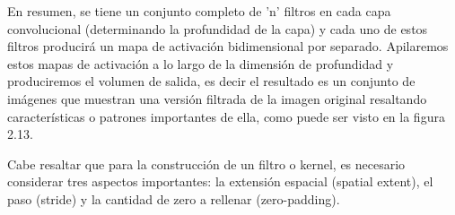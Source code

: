 		En resumen, se tiene un conjunto completo de 'n' filtros en cada capa convolucional (determinando la profundidad de la capa) y cada uno de estos filtros producirá un mapa de activación bidimensional por separado. Apilaremos estos mapas de activación a lo largo de la dimensión de profundidad y produciremos el volumen de salida, es decir el resultado es un conjunto de imágenes que muestran una versión filtrada de la imagen original resaltando características o patrones importantes de ella, como puede ser visto en la figura 2.13.

		\vskip 0.4cm  
		Cabe resaltar que para la construcción de un filtro o kernel, es necesario considerar tres aspectos importantes: la extensión espacial (spatial extent), el paso (stride) y la cantidad de zero a rellenar (zero-padding).
		\newpage
		
